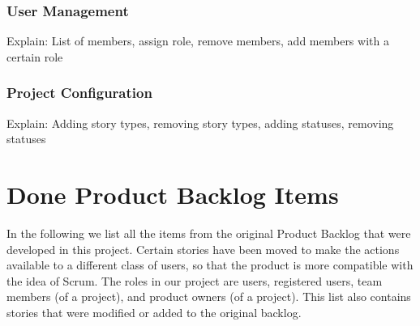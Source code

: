 \documentclass[
	accentcolor=tud1a %
]{tudreport}
\begin{document}
\subsection{User Management}
\label{sec:user-mgmt}

Explain: List of members, assign role, remove members, add members with a certain role

\subsection{Project Configuration}
\label{sec:proj-config}

Explain: Adding story types, removing story types, adding statuses, removing statuses

\chapter{Done Product Backlog Items}
\label{ch:done-pbis}

In the following we list all the items from the original Product Backlog that were developed in this project. Certain stories have been moved to make the actions available to a different class of users, so that the product is more compatible with the idea of Scrum. The roles in our project are users, registered users, team members (of a project), and product owners (of a project). This list also contains stories that were modified or added to the original backlog.

\end{document}
